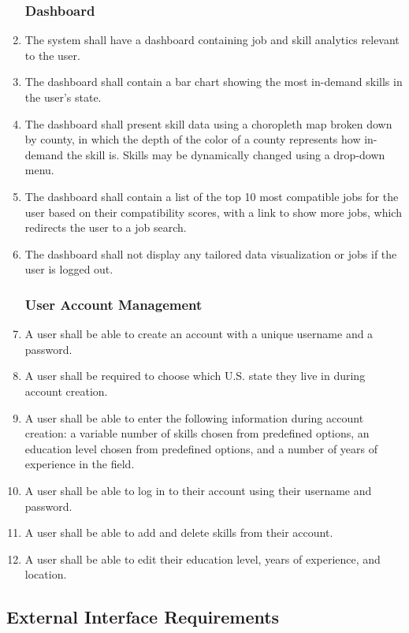 \documentclass[titlepage]{article}
\def\threedigits#1{%
\ifnum#1<100 0\fi 
\ifnum#1<10 0\fi 
\number#1}
\begin{document}
\begin{enumerate}[label={\textbf{FR\protect\threedigits{\theenumi}}}, leftmargin = *]
\subsubsection{Dashboard}
    \item The system shall have a dashboard containing job and skill analytics relevant to the user.
    \item The dashboard shall contain a bar chart showing the most in-demand skills in the user's state.
    \item The dashboard shall present skill data using a choropleth map broken down by county, in which the depth of the color of a county represents how in-demand the skill is. Skills may be dynamically changed using a drop-down menu.
    \item The dashboard shall contain a list of the top 10 most compatible jobs for the user based on their compatibility scores, with a link to show more jobs, which redirects the user to a job search.
    \item The dashboard shall not display any tailored data visualization or jobs if the user is logged out.

\subsubsection{User Account Management}
    \item A user shall be able to create an account with a unique username and a password.
    \item A user shall be required to choose which U.S. state they live in during account creation.
    \item A user shall be able to enter the following information during account creation: a variable number of skills chosen from predefined options, an education level chosen from predefined options, and a number of years of experience in the field.
    \item A user shall be able to log in to their account using their username and password.
    \item A user shall be able to add and delete skills from their account.
    \item A user shall be able to edit their education level, years of experience, and location.
\end{enumerate}

\subsection{External Interface Requirements}
\end{document}
